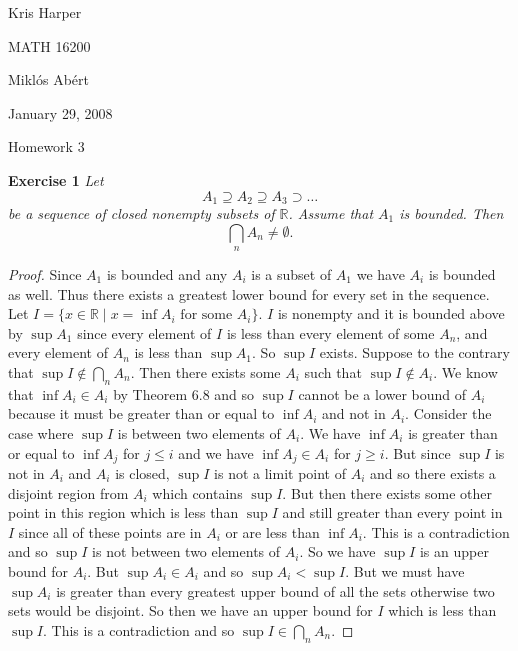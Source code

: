 \documentclass{article}
\begin{document}
\begin{flushright}
Kris Harper

MATH 16200

Mikl\'{o}s Ab\'{e}rt

January 29, 2008
\end{flushright}

\begin{center}
Homework 3
\end{center}

\begin{flushleft}

\textbf{Exercise 1}
\textsl{Let
\[
A_1 \supseteq A_2 \supseteq A_3 \supset \dots
\]
be a sequence of closed nonempty subsets of $\mathbb{R}$. Assume that $A_1$ is bounded. Then
\[
\bigcap_n A_n \neq \emptyset.
\]}
\begin{proof}
Since $A_1$ is bounded and any $A_i$ is a subset of $A_1$ we have $A_i$ is bounded as well. Thus there exists a greatest lower bound for every set in the sequence. Let $I=\{x \in \mathbb{R} \mid x = \inf A_i \text{ for some $A_i$}\}$. $I$ is nonempty and it is bounded above by $\sup A_1$ since every element of $I$ is less than every element of some $A_n$, and every element of $A_n$ is less than $\sup A_1$. So $\sup I$ exists. Suppose to the contrary that $\sup I \notin \bigcap_n A_n$. Then there exists some $A_i$ such that $\sup I \notin A_i$. We know that $\inf A_i \in A_i$ by Theorem 6.8 and so $\sup I$ cannot be a lower bound of $A_i$ because it must be greater than or equal to $\inf A_i$ and not in $A_i$. Consider the case where $\sup I$ is between two elements of $A_i$. We have $\inf A_i$ is greater than or equal to $\inf A_j$ for $j \leq i$ and we have $\inf A_j \in A_i$ for $j \geq i$. But since $\sup I$ is not in $A_i$ and $A_i$ is closed, $\sup I$ is not a limit point of $A_i$ and so there exists a disjoint region from $A_i$ which contains $\sup I$. But then there exists some other point in this region which is less than $\sup I$ and still greater than every point in $I$ since all of these points are in $A_i$ or are less than $\inf A_i$. This is a contradiction and so $\sup I$ is not between two elements of $A_i$. So we have $\sup I$ is an upper bound for $A_i$. But $\sup A_i \in A_i$ and so $\sup A_i < \sup I$. But we must have $\sup A_i$ is greater than every greatest upper bound of all the sets otherwise two sets would be disjoint. So then we have an upper bound for $I$ which is less than $\sup I$. This is a contradiction and so $\sup I \in \bigcap_n A_n$.
\end{proof} 


\end{flushleft}
\end{document}
